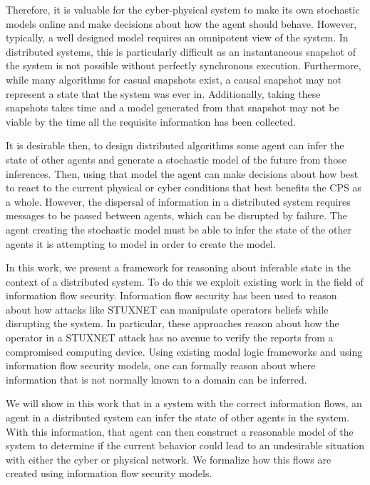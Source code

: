 Therefore, it is valuable for the cyber-physical system to make its own stochastic models online and make decisions about how the agent should behave. However, typically, a well designed model requires an omnipotent view of the system. In distributed systems, this is particularly difficult as an instantaneous snapshot of the system is not possible without perfectly synchronous execution. Furthermore, while many algorithms for casual snapshots exist, a causal snapshot may not represent a state that the system was ever in. Additionally, taking these snapshots takes time and a model generated from that snapshot may not be viable by the time all the requisite information has been collected.

It is desirable then, to design distributed algorithms some agent can infer the state of other agents and generate a stochastic model of the future from those inferences. Then, using that model the agent can make decisions about how best to react to the current physical or cyber conditions that best benefits the CPS as a whole. However, the dispersal of information in a distributed system requires messages to be passed between agents, which can be disrupted by failure. The agent creating the stochastic model must be able to infer the state of the other agents it is attempting to model in order to create the model.

In this work, we present a framework for reasoning about inferable state in the context of a distributed system. To do this we exploit existing work in the field of information flow security. Information flow security has been used to reason about how attacks like STUXNET can manipulate operators beliefs while disrupting the system. In particular, these approaches reason about how the operator in a STUXNET attack has no avenue to verify the reports from a compromised computing device. Using existing modal logic frameworks and using information flow security models, one can formally reason about where information that is not normally known to a domain can be inferred.

We will show in this work that in a system with the correct information flows, an agent in a distributed system can infer the state of other agents in the system. With this information, that agent can then construct a reasonable model of the system to determine if the current behavior could lead to an undesirable situation with either the cyber or physical network. We formalize how this flows are created using information flow security models.

